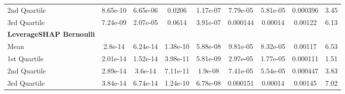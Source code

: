 {\begin{tabular} {lcccccccc}
\hspace{7pt}2nd Quartile & 8.65e-10 & \cellcolor{bronze!60}6.65e-06 & \cellcolor{bronze!60}0.0206 & \cellcolor{bronze!60}1.17e-07 & \cellcolor{silver!60}7.79e-05 & \cellcolor{silver!60}5.81e-05 & \cellcolor{gold!60}0.000396 & \cellcolor{gold!60}3.45 \\ 
\hspace{7pt}3rd Quartile & 7.24e-09 & \cellcolor{bronze!60}2.07e-05 & \cellcolor{bronze!60}0.0614 & \cellcolor{silver!60}3.91e-07 & \cellcolor{gold!60}0.000144 & \cellcolor{silver!60}0.00014 & \cellcolor{gold!60}0.00122 & \cellcolor{gold!60}6.13 \\ 
\addlinespace[1ex] 
\textbf{LeverageSHAP Bernoulli} &  &  &  &  &  &  &  &  \\ 
\hspace{7pt}Mean & \cellcolor{silver!60}2.8e-14 & \cellcolor{silver!60}6.24e-14 & \cellcolor{gold!60}1.38e-10 & \cellcolor{gold!60}5.88e-08 & \cellcolor{gold!60}9.81e-05 & \cellcolor{gold!60}8.32e-05 & \cellcolor{silver!60}0.00117 & \cellcolor{silver!60}6.53 \\ 
\hspace{7pt}1st Quartile & \cellcolor{gold!60}2.01e-14 & \cellcolor{silver!60}1.52e-14 & \cellcolor{silver!60}3.98e-11 & \cellcolor{gold!60}5.81e-09 & \cellcolor{gold!60}2.97e-05 & \cellcolor{gold!60}1.77e-05 & \cellcolor{silver!60}0.000111 & \cellcolor{silver!60}1.51 \\ 
\hspace{7pt}2nd Quartile & \cellcolor{silver!60}2.89e-14 & \cellcolor{silver!60}3.6e-14 & \cellcolor{silver!60}7.11e-11 & \cellcolor{gold!60}1.9e-08 & \cellcolor{gold!60}7.41e-05 & \cellcolor{gold!60}5.54e-05 & \cellcolor{silver!60}0.000447 & \cellcolor{silver!60}3.83 \\ 
\hspace{7pt}3rd Quartile & \cellcolor{gold!60}3.84e-14 & \cellcolor{silver!60}6.74e-14 & \cellcolor{gold!60}1.24e-10 & \cellcolor{gold!60}6.78e-08 & \cellcolor{silver!60}0.000151 & \cellcolor{gold!60}0.00014 & \cellcolor{silver!60}0.00145 & \cellcolor{silver!60}7.02 \\ 
\bottomrule
\end{tabular}}